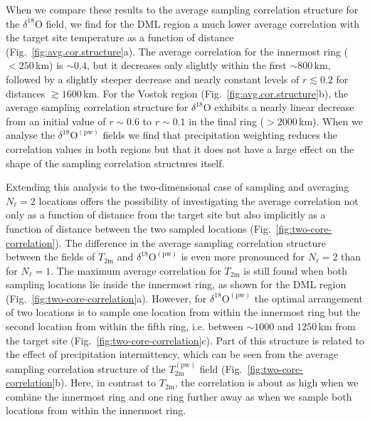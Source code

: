 \documentclass[cp]{copernicus}
\begin{document}
When we compare these results to the average sampling correlation structure for
the $\delta^{18}\mathrm{O}$ field, we find for the DML region a much lower
average correlation with the target site temperature as a function of distance
(Fig.~\ref{fig:avg.cor.structure}a). The average correlation for the innermost
ring ($<250$\,km) is $\sim0.4$, but it decreases only slightly within the first
$\sim800$\,km, followed by a slightly steeper decrease and nearly constant
levels of $r\lesssim0.2$ for distances $\gtrsim1600$\,km. For the Vostok region
(Fig.~\ref{fig:avg.cor.structure}b), the average sampling correlation structure
for $\delta^{18}\mathrm{O}$ exhibits a nearly linear decrease from an initial
value of $r\sim0.6$ to $r\sim0.1$ in the final ring ($>2000$\,km). When we
analyse the $\delta^{18}\mathrm{O}^{\mathrm{(pw)}}$ fields we find that
precipitation weighting reduces the correlation values in both regions but that
it does not have a large effect on the shape of the sampling correlation
structures itself.

Extending this analysis to the two-dimensional case of sampling and averaging
$N_{\ell}=2$ locations offers the possibility of investigating the average
correlation not only as a function of distance from the target site but also
implicitly as a function of distance between the two sampled locations
(Fig.~\ref{fig:two-core-correlation}). The difference in the average sampling
correlation structure between the fields of $T_{\mathrm{2m}}$ and
$\delta^{18}\mathrm{O}^{\mathrm{(pw)}}$ is even more pronounced for $N_{\ell}=2$
than for $N_{\ell}=1$. The maximum average correlation for $T_{\mathrm{2m}}$ is
still found when both sampling locations lie inside the innermost ring, as shown
for the DML region (Fig.~\ref{fig:two-core-correlation}a). However, for
$\delta^{18}\mathrm{O}^{\mathrm{(pw)}}$ the optimal arrangement of two locations
is to sample one location from within the innermost ring but the second location
from within the fifth ring, i.e. between $\sim1000$ and $1250$\,km from the
target site (Fig.~\ref{fig:two-core-correlation}c). Part of this structure is
related to the effect of precipitation intermittency, which can be seen from the
average sampling correlation structure of the $T_{\mathrm{2m}}^{\mathrm{(pw)}}$
field (Fig.~\ref{fig:two-core-correlation}b). Here, in contrast to
$T_{\mathrm{2m}}$, the correlation is about as high when we combine the
innermost ring and one ring further away as when we sample both locations from
within the innermost ring.
\end{document}

